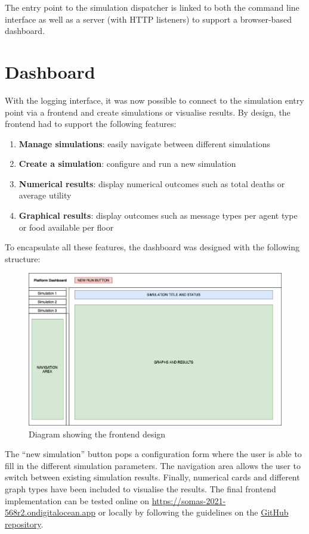 The entry point to the simulation dispatcher is linked to both the command line interface as well as a server (with HTTP listeners) to support a browser-based dashboard.

\section{Dashboard}

With the logging interface, it was now possible to connect to the simulation entry point via a frontend and create simulations or visualise results. By design, the frontend had to support the following features:

\begin{enumerate}
    \item \textbf{Manage simulations}: easily navigate between different simulations
    \item \textbf{Create a simulation}: configure and run a new simulation
    \item \textbf{Numerical results}: display numerical outcomes such as total deaths or average utility
    \item \textbf{Graphical results}: display outcomes such as message types per agent type or food available per floor
\end{enumerate}

To encapsulate all these features, the dashboard was designed with the following structure:

\begin{figure}[htb]
    \centering
    \includegraphics[width=\linewidth]{003_data_logging/images/design.png}
    \caption{Diagram showing the frontend design}
    \label{fig:design_ui}
\end{figure}

The ``new simulation'' button pops a configuration form where the user is able to fill in the different simulation parameters. The navigation area allows the user to switch between existing simulation results. Finally, numerical cards and different graph types have been included to visualise the results. The final frontend implementation can be tested online on \href{https://somas-2021-568r2.ondigitalocean.app}{https://somas-2021-568r2.ondigitalocean.app} or locally by following the guidelines on the \href{https://github.com/SOMAS2021/SOMAS2021#building-locally}{GitHub repository}.